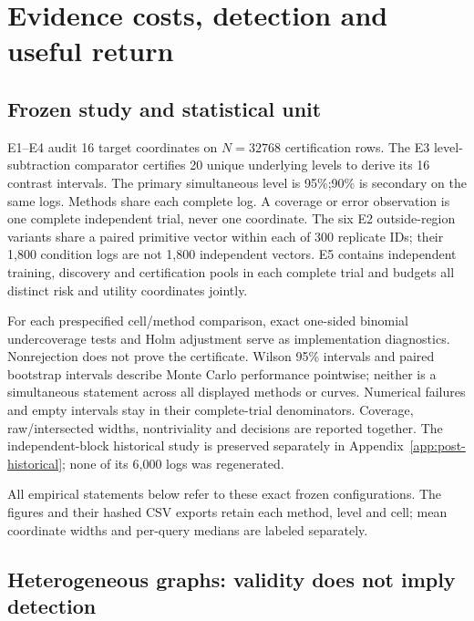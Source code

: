 \section{Evidence costs, detection and useful return}
\label{sec:post-evidence}

\subsection{Frozen study and statistical unit}

E1--E4 audit 16 target coordinates on $N=32768$ certification rows.
The E3 level-subtraction comparator certifies 20 unique underlying levels
to derive its 16 contrast intervals.
The primary simultaneous level is 95\%;90\% is secondary on the same logs.
Methods share each complete log. A coverage or error observation is one
complete independent trial, never one coordinate. The six E2 outside-region
variants share a paired primitive vector within each of 300 replicate IDs;
their 1,800 condition logs are not 1,800 independent vectors. E5 contains
independent training, discovery and certification pools in each complete
trial and budgets all distinct risk and utility coordinates jointly.

For each prespecified cell/method comparison, exact one-sided binomial
undercoverage tests and Holm adjustment serve as implementation diagnostics.
Nonrejection does not prove the certificate. Wilson 95\% intervals and paired
bootstrap intervals describe Monte Carlo performance pointwise; neither is a
simultaneous statement across all displayed methods or curves. Numerical
failures and empty intervals stay in their complete-trial denominators.
Coverage, raw/intersected widths, nontriviality and decisions are reported
together. The independent-block historical study is preserved separately
in Appendix~\ref{app:post-historical}; none of its 6,000 logs was regenerated.



All empirical statements below refer to these exact frozen configurations.
The figures and their hashed CSV exports retain each method, level and cell;
mean coordinate widths and per-query medians are labeled separately.

\subsection{Heterogeneous graphs: validity does not imply detection}

